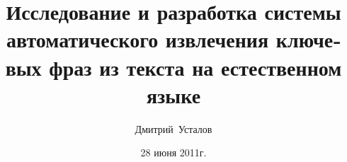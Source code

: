 \sloppy

\newcommand{\UTFencname}{EU1}
\newcommand{\cyrillicencoding}{EU1}

\usepackage{amsmath,amssymb}
\usepackage[quiet]{fontspec}
\usepackage{xunicode}
\usepackage{xltxtra}


\usepackage{polyglossia}
\setdefaultlanguage{russian}

\setmainfont{PT Serif}
\setsansfont{PT Sans}
\setmonofont[Scale=0.8]{DejaVu Sans Mono}

\title{Исследование и разработка системы автоматического извлечения
ключевых фраз из текста на естественном языке}
\author{Дмитрий~Усталов}
\date{28 июня 2011г.}

\usepackage{graphicx}
\graphicspath{{..//images/}}

\usepackage{subfig}

